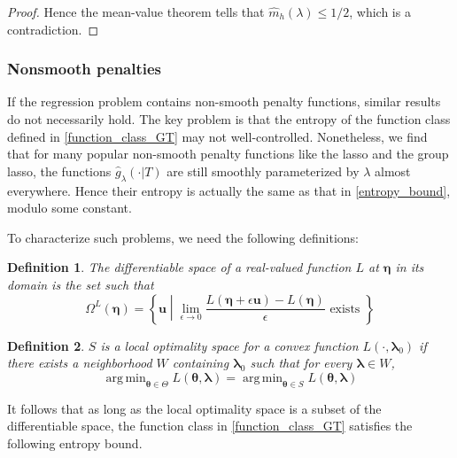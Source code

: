 \documentclass[12pt]{article}
\newtheorem{definition}{Definition}
\DeclareMathOperator*{\argmin}{arg\,min}
\begin{document}
\begin{proof}
Hence the mean-value theorem tells that $\hat{m}_{h}(\lambda)\le1/2$, which is a contradiction.
\end{proof}

\subsubsection{Nonsmooth penalties}

If the regression problem contains non-smooth penalty functions, similar results do not necessarily hold. The key problem is that the entropy of the function class defined in \eqref{function_class_GT} may not well-controlled. Nonetheless, we find that for many popular non-smooth penalty functions like the lasso and the group lasso, the functions $\hat{g}_\lambda(\cdot | T)$ are still smoothly parameterized by $\lambda$ almost everywhere. Hence their entropy is actually the same as that in \eqref{entropy_bound}, modulo some constant.

To characterize such problems, we need the following definitions:

\begin{definition}
The differentiable space of a real-valued function $L$ at $\boldsymbol \eta$ in its domain is the set such that
\begin{equation}
\Omega^{L}(\boldsymbol \eta) = \left \{ \boldsymbol u \middle | \lim_{\epsilon \rightarrow 0} \frac{L(\boldsymbol \eta + \epsilon \boldsymbol u) - L(\boldsymbol \eta)}{\epsilon} \text{ exists } \right \}
\end{equation}
\end{definition}

\begin{definition}
$S$ is a local optimality space for a convex function $L(\cdot, \boldsymbol \lambda_0)$ if there exists a neighborhood $W$ containing $\boldsymbol \lambda_0$ such that for every $\boldsymbol \lambda \in W$,
\begin{equation}
\argmin_{\boldsymbol \theta \in \Theta} L(\boldsymbol \theta, \boldsymbol \lambda) =
\argmin_{\boldsymbol \theta \in S} L(\boldsymbol \theta, \boldsymbol \lambda)
\end{equation}

\end{definition}

It follows that as long as the local optimality space is a subset of the differentiable space, the function class in \eqref{function_class_GT} satisfies the following entropy bound. 
\end{document}
